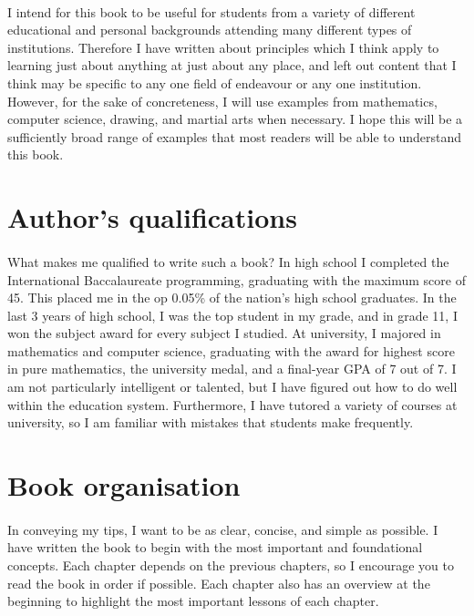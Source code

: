 \documentclass[11pt]{memoir}
\begin{document}
	\paragraph{}
	I intend for this book to be useful for students from a variety of different educational
	and personal backgrounds attending many different types of institutions. Therefore I
	have written about principles which I think apply to learning just about anything at
	just about any place, and left out content that I think may be specific to any one field
	of endeavour or any one institution. However, for the sake of concreteness, I will use 
	examples from mathematics, computer science, drawing, and martial arts when necessary. 
	I hope this will be a sufficiently broad range of examples that most readers will be 
	able to understand this book. 
	
	\section{Author's qualifications}
	\paragraph{}
	What makes me qualified to write such a book? In high school I completed the 
	International Baccalaureate programming, graduating with the maximum score of 45.
	This placed me in the op 0.05\% of the nation's high school graduates. In the last
	3 years of high school, I was the top student in my grade, and in grade 11, I won the
	subject award for every subject I studied. At university, I majored in mathematics and
	computer science, graduating with the award for highest score in pure mathematics, the
	university medal, and a final-year GPA of 7 out of 7. I am not particularly intelligent
	or talented, but I have figured out how to do well within the education system. 
	Furthermore, I have tutored a variety of courses at university, so I am familiar with 
	mistakes that students make frequently.
	
	\section{Book organisation}
	\paragraph{}
	In conveying my tips, I want to be as clear, concise, and simple as possible. 
	I have written the book to begin with the most important and foundational concepts. 
	Each chapter depends on the previous chapters, so I encourage you to read the book 
	in order if possible. Each chapter also has an overview at the beginning to highlight the most important lessons of each chapter. 
	
\end{document}
